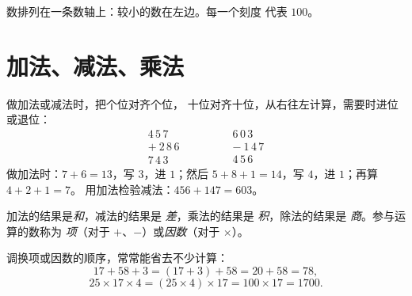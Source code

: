 \begin{omfigure}

{\small 数排列在一条数轴上：较小的数在左边。每一个刻度
代表 $100$。}
\end{omfigure}

\section{加法、减法、乘法}

\begin{example}[竖式计算]\label{ex:g6:wholes:columns}
做加法或减法时，把个位对齐个位，
十位对齐十位，从右往左计算，需要时进位或退位：
\[
\begin{array}{r}
4\,5\,7 \\
+\ 2\,8\,6 \\
\hline
7\,4\,3
\end{array}
\qquad\qquad
\begin{array}{r}
6\,0\,3 \\
-\ 1\,4\,7 \\
\hline
4\,5\,6
\end{array}
\]
做加法时：$7 + 6 = 13$，写 $3$，进 $1$；然后
$5 + 8 + 1 = 14$，写 $4$，进 $1$；再算 $4 + 2 + 1 = 7$。
用加法检验减法：$456 + 147 = 603$。
\end{example}

\begin{remark}[词汇]
加法的结果是\emph{和}，减法的结果是
\emph{差}，乘法的结果是
\emph{积}，除法的结果是
\emph{商}。参与运算的数称为
\emph{项}（对于 $+$、$-$）或\emph{因数}（对于 $\times$）。
\end{remark}

\begin{example}[巧算]\label{ex:g6:wholes:smart}
调换项或因数的顺序，常常能省去不少计算：
\[
17 + 58 + 3 = (17 + 3) + 58 = 20 + 58 = 78 ,
\]
\[
25 \times 17 \times 4 = (25 \times 4) \times 17 = 100 \times 17 = 1700 .
\]
\end{example}

